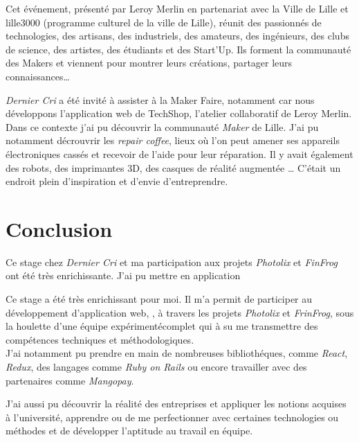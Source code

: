 \bigskip

Cet événement, présenté par Leroy Merlin en partenariat avec la Ville de
Lille et lille3000 (programme culturel de la ville de Lille), réunit des
passionnés de technologies, des artisans, des industriels, des amateurs,
des ingénieurs, des clubs de science, des artistes, des étudiants et des
Start'Up. Ils forment la communauté des Makers et viennent pour montrer
leurs créations, partager leurs connaissances\ldots{}

\bigskip

\emph{Dernier Cri} a été invité à assister à la Maker Faire, notamment
car nous développons l'application web de TechShop, l'atelier
collaboratif de Leroy Merlin. Dans ce contexte j'ai pu découvrir la
communauté \emph{Maker} de Lille. J'ai pu notamment décrouvrir les
\emph{repair coffee}, lieux où l'on peut amener ses appareils
électroniques cassés et recevoir de l'aide pour leur réparation. Il y
avait également des robots, des imprimantes 3D, des casques de réalité
augmentée \ldots{} C'était un endroit plein d'inspiration et d'envie
d'entreprendre.

\newpage

\section{Conclusion}\label{conclusion-2}

Ce stage chez \emph{Dernier Cri} et ma participation aux projets
\emph{Photolix} et \emph{FinFrog} ont été très enrichissante. J'ai pu
mettre en application

\bigskip

Ce stage a été très enrichissant pour moi. Il m'a permit de participer
au développement d'application web, , à travers les projets
\emph{Photolix} et \emph{FrinFrog}, sous la houlette d'une équipe
expérimentécomplet qui à su me transmettre des compétences techniques et
méthodologiques.\\
J'ai notamment pu prendre en main de nombreuses bibliothéques, comme
\emph{React}, \emph{Redux}, des langages comme \emph{Ruby on Rails} ou
encore travailler avec des partenaires comme \emph{Mangopay}.

\bigskip

J'ai aussi pu découvrir la réalité des entreprises et appliquer les
notions acquises à l'université, apprendre ou de me perfectionner avec
certaines technologies ou méthodes et de développer l'aptitude au
travail en équipe.

\bigskip

